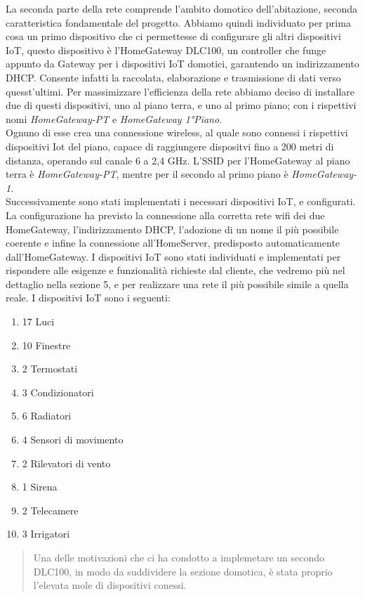 \documentclass[italian, 12pt, a4paper]{article}
\begin{document}
La seconda parte della rete comprende l'ambito domotico dell'abitazione, seconda caratteristica fondamentale del progetto. Abbiamo quindi individuato per prima cosa un primo dispositivo che ci permettesse di configurare gli altri dispositivi IoT, questo dispositivo è l'HomeGateway DLC100, un controller che funge appunto da Gateway per i dispositivi IoT domotici, garantendo un indirizzamento DHCP. Consente infatti la raccolata, elaborazione e trasmissione di dati verso quesst'ultimi. Per massimizzare l'efficienza della rete abbiamo deciso di installare due di questi dispositivi, uno al piano terra, e uno al primo piano; con i rispettivi nomi \emph{HomeGateway-PT} e \emph{HomeGateway 1°Piano}.\\Ognuno di esse crea una connessione wireless, al quale sono connessi i rispettivi dispositivi Iot del piano, capace di raggiungere dispositvi fino a 200 metri di distanza, operando sul canale 6 a 2,4 GHz. L'SSID per l'HomeGateway al piano terra è \emph{HomeGateway-PT}, mentre per il secondo al primo piano è \emph{HomeGateway-1}.\\ Successivamente sono stati implementati i necessari dispositivi IoT, e configurati. La configurazione ha previsto la connessione alla corretta rete wifi dei due HomeGateway, l'indirizzamento DHCP, l'adozione di un nome il più possibile coerente e infine la connessione all'HomeServer, predisposto automaticamente dall'HomeGateway. I dispositivi IoT sono stati individuati e implementati per rispondere alle esigenze e funzionalità richieste dal cliente, che vedremo più nel dettaglio nella sezione 5, e per realizzare una rete il più possibile simile a quella reale. I dispositivi IoT sono i seguenti: 
\begin{enumerate}
    \item 17 Luci
    \item 10 Finestre
    \item 2 Termostati
    \item 3 Condizionatori
    \item 6 Radiatori
    \item 4 Sensori di movimento
    \item 2 Rilevatori di vento
    \item 1 Sirena
    \item 2 Telecamere
    \item 3 Irrigatori
\end{enumerate}
\begin{quote}
    Una delle motivazioni che ci ha condotto a implemetare un secondo DLC100, in modo da suddividere la sezione domotica, è stata proprio l'elevata mole di dispositivi conessi.\\ 
\end{quote}
\end{document}
